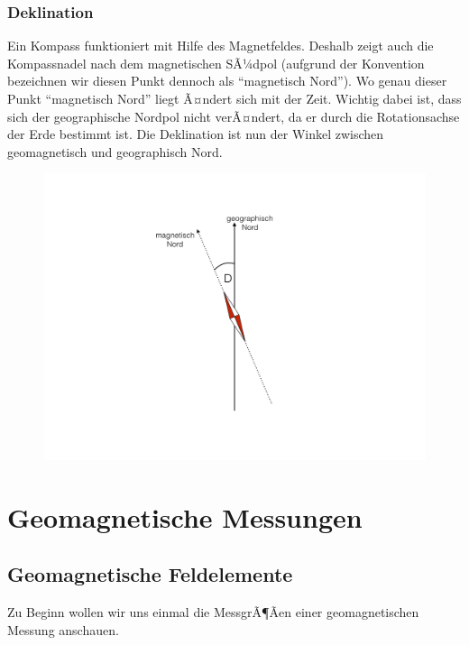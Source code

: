 \subsubsection{Deklination}
Ein Kompass funktioniert mit Hilfe des Magnetfeldes. Deshalb zeigt auch die Kompassnadel nach dem magnetischen SÃ¼dpol (aufgrund der Konvention bezeichnen wir diesen Punkt dennoch als "`magnetisch Nord"'). Wo genau dieser Punkt "`magnetisch Nord"' liegt Ã¤ndert sich mit der Zeit. Wichtig dabei ist, dass sich der geographische Nordpol nicht verÃ¤ndert, da er durch die Rotationsachse der Erde bestimmt ist. Die Deklination ist nun der Winkel zwischen geomagnetisch und geographisch Nord. 
\begin{figure}[H]
	\centering
	\includegraphics[scale = 0.4]{MagnetikBilder/Deklination}
\end{figure}


\section{Geomagnetische Messungen}
\subsection{Geomagnetische Feldelemente}
Zu Beginn wollen wir uns einmal die MessgrÃ¶Ãen einer geomagnetischen Messung anschauen.


